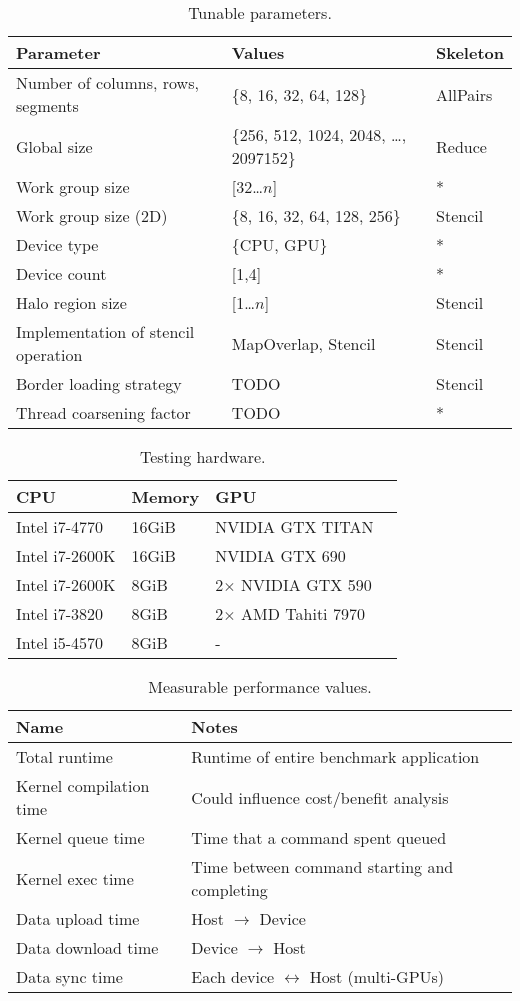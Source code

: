 \begin{table}
\footnotesize
\centering
\begin{tabular}{| l | l | l |}
\hline
\textbf{Parameter} & \textbf{Values} & \textbf{Skeleton}\\
\hline
Number of columns, rows, segments & \{8, 16, 32, 64, 128\} & AllPairs\\
Global size & \{256, 512, 1024, 2048, \ldots, 2097152\} & Reduce\\
Work group size & [32\ldots$n$] & *\\
Work group size (2D) & \{8, 16, 32, 64, 128, 256\} & Stencil\\
Device type & \{CPU, GPU\} & *\\
Device count & [1,4] & *\\
Halo region size & [1\ldots$n$] & Stencil\\
Implementation of stencil operation & {MapOverlap, Stencil} & Stencil\\
Border loading strategy & TODO & Stencil\\
Thread coarsening factor & TODO & *\\
\hline
\end{tabular}
\caption{Tunable parameters.}
\label{tab:knobs}
\end{table}

\begin{table}
\footnotesize
\centering
\begin{tabular}{| l | l | l | l |}
\hline
\textbf{CPU} & \textbf{Memory} & \textbf{GPU}\\
\hline
Intel i7-4770 & 16GiB & NVIDIA GTX TITAN\\
Intel i7-2600K & 16GiB & NVIDIA GTX 690\\
Intel i7-2600K & 8GiB & 2$\times$ NVIDIA GTX 590\\
Intel i7-3820 & 8GiB & 2$\times$ AMD Tahiti 7970\\
Intel i5-4570 & 8GiB & -\\
\hline
\end{tabular}
\caption{Testing hardware.}
\label{tab:hw}
\end{table}

\begin{table}
\footnotesize
\centering
\begin{tabular}{| l | l |}
  \hline
  \textbf{Name} & \textbf{Notes}\\
  \hline
  Total runtime & Runtime of entire benchmark application\\
  Kernel compilation time & Could influence cost/benefit analysis\\
  Kernel queue time & Time that a command spent queued\\
  Kernel exec time & Time between command starting and completing\\
  Data upload time & Host $\rightarrow$ Device\\
  Data download time & Device $\rightarrow$ Host\\
  Data sync time & Each device $\leftrightarrow$ Host (multi-GPUs)\\
  \hline
\end{tabular}
\caption{Measurable performance values.}
\label{tab:metric}
\end{table}

